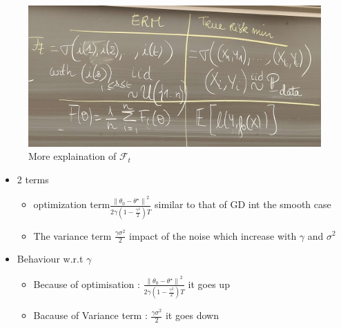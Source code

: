 \begin{figure}[!h]
    \centering
    \includegraphics[width=.5\textwidth]{figs/thm_F_t.jpg}
    \caption{More explaination of $ \mathcal{F}_t $ }
    \label{explaination}
\end{figure}

\begin{note}
    \begin{itemize}
        \item 2 terms \begin{itemize}
            \item optimization term$\frac{\left\| \theta _0 - \theta ^\star  \right\|  ^2}{ 2 \gamma ( 1 - \frac{\gamma ^2}{2} ) T }$ similar to that of GD int the smooth case 
            \item The variance term $ \frac{\gamma  \sigma ^2}{2} $ impact of the noise which increase with $ \gamma  $ and $ \sigma ^2 $ 
        \end{itemize}
        
        \item Behaviour w.r.t $ \gamma  $ \begin{itemize}
            \item Because of optimisation : $ \frac{\left\| \theta _0 - \theta ^\star  \right\|  ^2}{ 2 \gamma ( 1 - \frac{\gamma ^2}{2} ) T } $ it goes up
            \item Bacause of Variance term : $ \frac{\gamma  \sigma ^2}{2} $ it goes down
        \end{itemize}
        

\end{itemize}
\end{note}
